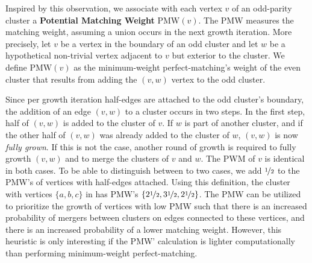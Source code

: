 Inspired by this observation, we associate with each vertex $v$ of an odd-parity cluster a \textbf{Potential Matching Weight} $\text{PMW}(v)$. The PMW measures the matching weight, assuming a union occurs in the next growth iteration. More precisely,
let $v$ be a vertex in the boundary of an odd cluster and let $w$ be a hypothetical non-trivial vertex adjacent to $v$ but exterior to the cluster. We define $\text{PMW}(v)$ as the minimum-weight perfect-matching's weight of the even cluster that results from adding the $(v,w)$ vertex to the odd cluster. %
    
Since per growth iteration half-edges are attached to the odd cluster's boundary, the addition of an edge $(v,w)$ to a cluster occurs in two steps. In the first step, half of $(v,w)$ is added to the cluster of $v$. If $w$ is part of another cluster, and if the other half of $(v,w)$ was already added to the cluster of $w$, $(v,w)$ is now \emph{fully grown}. If this is not the case, another round of growth is required to fully growth $(v,w)$ and to merge the clusters of $v$ and $w$. The PWM of $v$ is identical in both cases. To be able to distinguish between to two cases, we add $\nicefrac{1}{2}$ to the PMW's of vertices with half-edges attached. Using this definition, the cluster with vertices $\{a,b,c\}$ in  has PMW's $\{2\nicefrac{1}{2}, 3\nicefrac{1}{2}, 2\nicefrac{1}{2}\}$. The PMW can be utilized to prioritize the growth of vertices with low PMW such that there is an increased probability of mergers between clusters on edges connected to these vertices, and there is an increased probability of a lower matching weight. However, this heuristic is only interesting if the PMW' calculation is lighter computationally than performing minimum-weight perfect-matching. %


